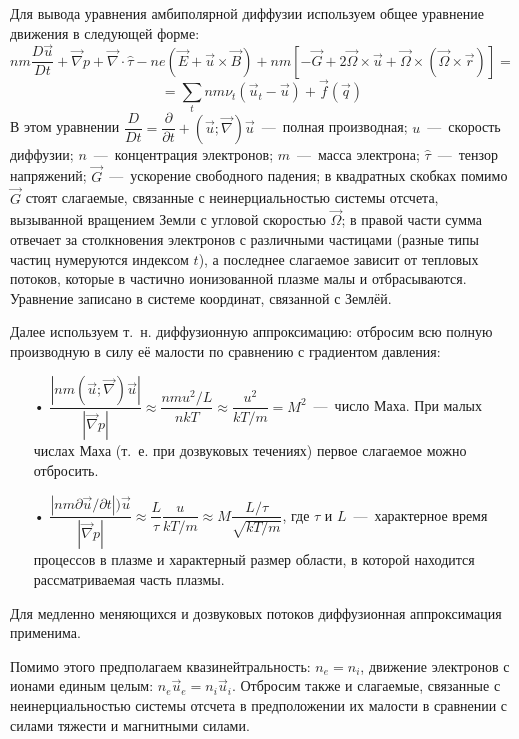 \documentclass[14pt, a4paper, fleqn]{extarticle}
\begin{document}
Для вывода уравнения амбиполярной диффузии используем общее уравнение движения в следующей форме: $$nm\dfrac{D\vec{u}}{Dt}+\vec{\nabla} p + \vec{\nabla}\cdot \hat{\tau} - ne(\vec{E}+\vec{u}\times \vec{B})+nm[-\vec{G}+2\vec{\Omega}\times \vec{u}+\vec{\Omega}\times(\vec{\Omega}\times\vec{r})]=$$
$$=\sum_t nm\nu_t (\vec{u}_t-\vec{u})+ \vec{f}(\vec{q})$$
В этом уравнении $\dfrac{D}{Dt}=\dfrac{\partial}{\partial t}+(\vec{u}; \vec{\nabla})\vec{u}$~---~полная производная; $u$~---~скорость диффузии; $n$~---~концентрация электронов; $m$~---~масса электрона; $\hat{\tau}$~---~тензор напряжений; $\vec{G}$~---~ускорение свободного падения; в квадратных скобках помимо $\vec{G}$ стоят слагаемые, связанные с неинерциальностью системы отсчета, вызыванной вращением Земли с угловой скоростью $\vec{\Omega}$; в правой части сумма отвечает за столкновения электронов с различными частицами (разные типы частиц нумеруются индексом $t$), а последнее слагаемое зависит от тепловых потоков, которые в частично ионизованной плазме малы и отбрасываются. Уравнение записано в системе координат, связанной с Землёй.

\bigskip

Далее используем т.~н. диффузионную аппроксимацию: отбросим всю полную производную в силу её малости по сравнению с градиентом давления:

\begin{itemize}

\item[•] $\dfrac{|nm(\vec{u}; \vec{\nabla})\vec{u}|}{|\vec{\nabla}p|}\approx \dfrac{nmu^2/L}{nkT}\approx \dfrac{u^2}{kT/m}=M^2$~---~число Маха. При малых числах Маха (т.~е. при дозвуковых течениях) первое слагаемое можно отбросить.

\item[•] $\dfrac{|nm\partial\vec{u}/\partial t|)\vec{u}}{|\vec{\nabla}p|}\approx \dfrac{L}{\tau} \dfrac{u}{kT/m}\approx M\dfrac{L/\tau}{\sqrt{kT/m}}$, где $\tau$ и $L$~---~характерное время процессов в плазме и характерный размер области, в которой находится рассматриваемая часть плазмы.

\end{itemize}

Для медленно меняющихся и дозвуковых потоков диффузионная аппроксимация применима.

\bigskip

Помимо этого предполагаем квазинейтральность: $n_e=n_i$, движение электронов с ионами единым целым: $n_e \vec{u}_e=n_i \vec{u}_i$. Отбросим также и слагаемые, связанные с неинерциальностью системы отсчета в предположении их малости в сравнении с силами тяжести и магнитными силами.
\end{document}
